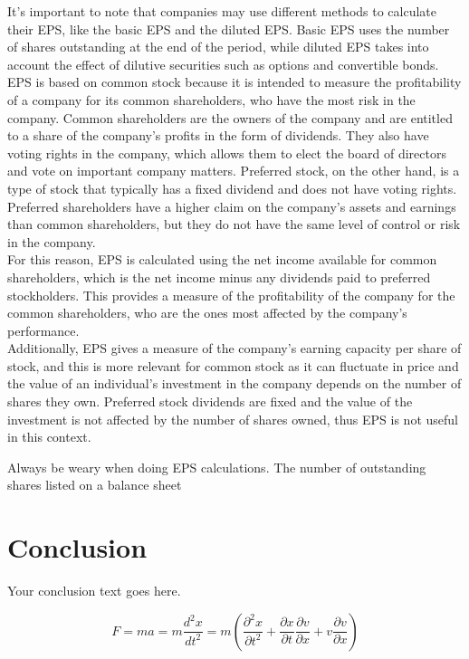 \documentclass{article}
\begin{document}
It's important to note that companies may use different methods to calculate their EPS, like the basic EPS and the diluted EPS. Basic EPS uses the number of shares outstanding at the end of the period, while diluted EPS takes into account the effect of dilutive securities such as options and convertible bonds.\\

EPS is based on common stock because it is intended to measure the profitability of a company for its common shareholders, who have the most risk in the company. Common shareholders are the owners of the company and are entitled to a share of the company's profits in the form of dividends. They also have voting rights in the company, which allows them to elect the board of directors and vote on important company matters. Preferred stock, on the other hand, is a type of stock that typically has a fixed dividend and does not have voting rights. Preferred shareholders have a higher claim on the company's assets and earnings than common shareholders, but they do not have the same level of control or risk in the company.\\

For this reason, EPS is calculated using the net income available for common shareholders, which is the net income minus any dividends paid to preferred stockholders. This provides a measure of the profitability of the company for the common shareholders, who are the ones most affected by the company's performance.\\

Additionally, EPS gives a measure of the company's earning capacity per share of stock, and this is more relevant for common stock as it can fluctuate in price and the value of an individual's investment in the company depends on the number of shares they own. Preferred stock dividends are fixed and the value of the investment is not affected by the number of shares owned, thus EPS is not useful in this context.

Always be weary when doing EPS calculations. The number of outstanding shares listed on a balance sheet
\section{Conclusion}

Your conclusion text goes here.


\begin{equation}
    F = ma = m\frac{d^2x}{dt^2} = m\left(\frac{\partial^2x}{\partial t^2} + \frac{\partial x}{\partial t}\frac{\partial v}{\partial x} + v\frac{\partial v}{\partial x}\right)
\end{equation}
\end{document}
